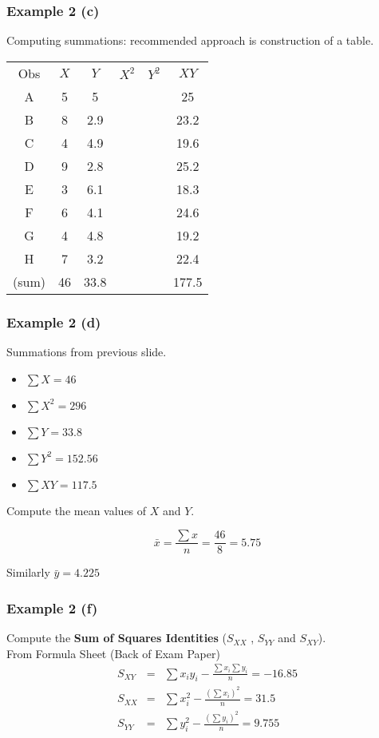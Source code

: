 \documentclass[a4]{beamer}
\begin{document}
\begin{frame}
\frametitle{Example 2 (c)}
Computing summations: recommended approach is construction of a table.\\
\begin{center}
\begin{tabular}{|c|c|c|c|c|c|}
  \hline
Obs	&	$X$	&	$Y$	&$X^2$	&$Y^2$	&	$XY$	\\
A 	&	5	&	5	&		&		&	25	      \\
B 	&	8	&	2.9	&		&		&	23.2	\\
C 	&	4	&	4.9	&		&		&	19.6	\\
D 	&	9	&	2.8	&		&		&	25.2	\\
E 	&	3	&	6.1	&		&		&	18.3	\\
F 	&	6	&	4.1	&		&		&	24.6	\\
G 	&	4	&	4.8	&		&		&	19.2	\\
H 	&	7	&	3.2	&		&		&	22.4	\\
(sum)&	46	&	33.8&		&		&	177.5	\\

  \hline
\end{tabular}
\end{center}

\end{frame}
\begin{frame}
\frametitle{Example 2 (d)}

Summations from previous slide.
\begin{itemize}
\item $\sum X = 46$
\item $\sum X^2 =296$
\item $\sum Y = 33.8$
\item $\sum Y^2 = 152.56$
\item $\sum XY = 117.5$
\end{itemize}
Compute the mean values of $X$ and $Y$.

\[ \bar{x} = \frac{\sum x}{n} = \frac{46}{8} = 5.75 \]

Similarly $\bar{y} =   4.225$
\end{frame}

\begin{frame}
\frametitle{Example 2 (f)}
Compute the \textbf{Sum of Squares Identities} ($S_{XX}$ , $S_{YY}$ and $S_{XY}$).\\
\bigskip
From Formula Sheet (Back of Exam Paper)
\begin{eqnarray*}
S_{XY} &=&
\sum x_iy_i - \frac{\sum x_i\sum y_i}{n} = -16.85\\
S_{XX} &=&
\sum x_i^2 - \frac{(\sum x_i)^2}{n} = 31.5\\
S_{YY} &=&
\sum y_i^2 - \frac{(\sum y_i)^2}{n} = 9.755\\
\end{eqnarray*}
\end{frame}
\end{document}
